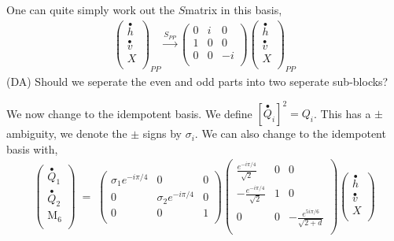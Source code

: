 \documentclass[12pt,a4paper]{article}
\newcounter{arrow}
\newcommand{\dave}[1]{{\color{ao(english)}\footnotesize{(DA) #1}}}
\begin{document}
One can quite simply work out the $S$matrix in this basis,
\begin{align}
\left( \begin{matrix}
\stackrel{\bullet}{h} \\
\stackrel{\bullet}{v} \\
X \\
\end{matrix} \right)_{PP}
\xrightarrow{S_{PP}} 
\left( \begin{matrix}
0&i  &0 \\ 
1&0 &0 \\
0&0& -i \\
\end{matrix} \right)
\left( \begin{matrix}
\stackrel{\bullet}{h} \\
\stackrel{\bullet}{v} \\
X \\\end{matrix} \right)_{PP}
\end{align}
\dave{Should we seperate the even and odd parts into two seperate sub-blocks?}

We now change to the idempotent basis. 
We define $\left[ \stackrel{\bullet}{Q}_{i}\right]^2  = Q_i$. 
This has a $\pm$ ambiguity, we denote the $\pm$ signs by $\sigma_i$. 
We can also change to the idempotent basis with,
\begin{align}
\left( \begin{matrix}
\stackrel{\bullet}{Q}_{1}\\
\stackrel{\bullet}{Q}_{2}\\
\text{M}_6 \\ 
\end{matrix} \right) \; =\;
\left( \begin{matrix}
\sigma_1 e^{- i \pi /4} &0&0\\
0&\sigma_2 e^{- i \pi /4} &0\\
0&0&1 \\
\end{matrix} \right)
\left( \begin{matrix}
\frac{e^{- i \pi /4}}{\sqrt{2}} & 0&0 \\
- \frac{e^{- i \pi /4}}{\sqrt{2}} & 1 & 0 \\
0 & 0& - \frac{e^{5 i \pi /6}}{\sqrt{2 + d}}\\
\end{matrix} \right)
\left( \begin{matrix}
\stackrel{\bullet}{h} \\
\stackrel{\bullet}{v} \\
X \\
\end{matrix} \right)
\end{align}
\end{document}
